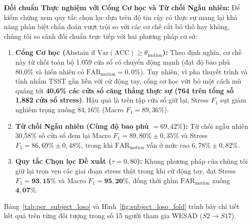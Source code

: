 \documentclass[conference]{IEEEtran}
\begin{document}
\textbf{Đối chuẩn Thực nghiệm với Cổng Cơ học và Từ chối Ngẫu nhiên:} Để kiểm chứng xem quy tắc chọn lọc dựa trên độ tin cậy có thực sự mang lại khả năng phân biệt chẩn đoán vượt trội so với các cơ chế cắt bỏ thô hay không, chúng tôi so sánh đối chuẩn trực tiếp với hai phương pháp cơ sở:
\begin{enumerate}
    \item \textbf{Cổng Cơ học ($\text{Abstain if } \text{Var}(\text{ACC}) \ge \theta_{\text{motion}}$):} Theo định nghĩa, cơ chế này từ chối toàn bộ 1.059 cửa sổ có chuyển động mạnh (đạt độ bao phủ 80,0\% và hiển nhiên có $\text{FAR}_{\text{motion}} = 0,0\%$). Tuy nhiên, vì pha thuyết trình và tính nhẩm TSST gắn liền với cử động tay, cổng cơ học vứt bỏ một cách mù quáng tới \textbf{40,6\% các cửa sổ căng thẳng thực sự (764 trên tổng số 1.882 cửa sổ stress)}. Hậu quả là trên tập cửa sổ giữ lại, Stress $F_1$ sụt giảm nghiêm trọng xuống $84,16\%$ (Macro $F_1 = 89,36\%$).
    \item \textbf{Từ chối Ngẫu nhiên (Cùng độ bao phủ $= 69,42\%$):} Từ chối ngẫu nhiên 30,58\% số cửa sổ đem lại Macro $F_1 = 89,80\% \pm 0,35\%$ và Stress $F_1 = 86,69\% \pm 0,48\%$, trong khi $\text{FAR}_{\text{motion}}$ vẫn ở mức cao $6,78\% \pm 0,82\%$.
    \item \textbf{Quy tắc Chọn lọc Đề xuất ($\tau = 0,80$):} Khung phương pháp của chúng tôi giữ lại trọn vẹn các giai đoạn stress thật trong khi cử động tay, đạt Stress $F_1 = \mathbf{93,15\%}$ và Macro $F_1 = \mathbf{95,20\%}$, đồng thời ghìm $\text{FAR}_{\text{motion}}$ xuống $\mathbf{4,07\%}$.
\end{enumerate}

Bảng~\ref{tab:per_subject_loso} và Hình~\ref{fig:subject_loso_fold} trình bày chi tiết kết quả trên từng đối tượng trong số 15 người tham gia WESAD ($S2 \rightarrow S17$).
\end{document}
